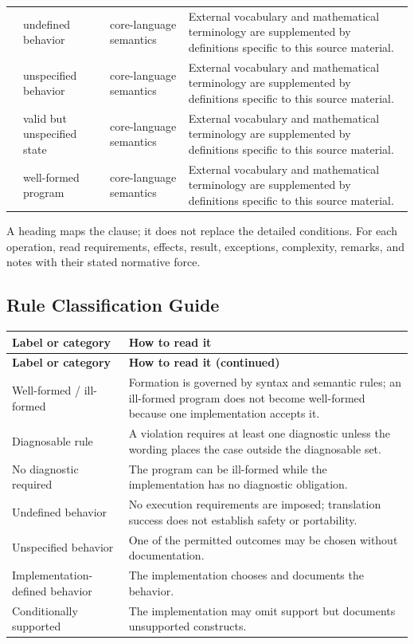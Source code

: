 \documentclass[11pt,letterpaper]{article}
\begin{document}
\begin{longtable}{@{}>{\RaggedRight\arraybackslash}p{}>{\RaggedRight\arraybackslash}p{}>{\RaggedRight\arraybackslash}p{}>{\RaggedRight\arraybackslash}p{}@{}}
3.62 & undefined behavior & core-language semantics & External vocabulary and mathematical terminology are supplemented by definitions specific to this source material.\\
3.63 & unspecified behavior & core-language semantics & External vocabulary and mathematical terminology are supplemented by definitions specific to this source material.\\
3.64 & valid but unspecified state & core-language semantics & External vocabulary and mathematical terminology are supplemented by definitions specific to this source material.\\
3.65 & well-formed program & core-language semantics & External vocabulary and mathematical terminology are supplemented by definitions specific to this source material.\\
\end{longtable}\normalsize
\begin{CornellReferenceNormativeBox}A heading maps the clause; it does not replace the detailed conditions. For each operation, read requirements, effects, result, exceptions, complexity, remarks, and notes with their stated normative force.\end{CornellReferenceNormativeBox}
\subsection*{Rule Classification Guide}
\small\begin{longtable}{@{}>{\RaggedRight\arraybackslash}p{}>{\RaggedRight\arraybackslash}p{}@{}}\toprule\textbf{Label or category} & \textbf{How to read it}\\\midrule\endfirsthead\toprule\textbf{Label or category} & \textbf{How to read it (continued)}\\\midrule\endhead\bottomrule\endfoot
Well-formed / ill-formed & Formation is governed by syntax and semantic rules; an ill-formed program does not become well-formed because one implementation accepts it.\\
Diagnosable rule & A violation requires at least one diagnostic unless the wording places the case outside the diagnosable set.\\
No diagnostic required & The program can be ill-formed while the implementation has no diagnostic obligation.\\
Undefined behavior & No execution requirements are imposed; translation success does not establish safety or portability.\\
Unspecified behavior & One of the permitted outcomes may be chosen without documentation.\\
Implementation-defined behavior & The implementation chooses and documents the behavior.\\
Conditionally supported & The implementation may omit support but documents unsupported constructs.\\
\end{longtable}\normalsize
\end{document}
